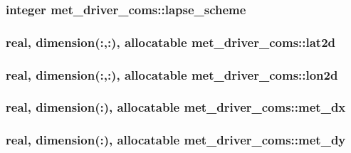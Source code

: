 \subsubsection[{lapse\+\_\+scheme}]{\setlength{\rightskip}{0pt plus 5cm}integer met\+\_\+driver\+\_\+coms\+::lapse\+\_\+scheme}\label{namespacemet__driver__coms_ae37a372059ee47809fc1211fac945fd9}
\hypertarget{namespacemet__driver__coms_ad4ba08a0bb7a7d239acca24ad643df43}{}
\subsubsection[{lat2d}]{\setlength{\rightskip}{0pt plus 5cm}real, dimension(\+:,\+:), allocatable met\+\_\+driver\+\_\+coms\+::lat2d}\label{namespacemet__driver__coms_ad4ba08a0bb7a7d239acca24ad643df43}
\hypertarget{namespacemet__driver__coms_a86a7d638d5a38f95de4804d9e6b72f86}{}
\subsubsection[{lon2d}]{\setlength{\rightskip}{0pt plus 5cm}real, dimension(\+:,\+:), allocatable met\+\_\+driver\+\_\+coms\+::lon2d}\label{namespacemet__driver__coms_a86a7d638d5a38f95de4804d9e6b72f86}
\hypertarget{namespacemet__driver__coms_a668ed875098df886a584635cacc54975}{}
\subsubsection[{met\+\_\+dx}]{\setlength{\rightskip}{0pt plus 5cm}real, dimension(\+:), allocatable met\+\_\+driver\+\_\+coms\+::met\+\_\+dx}\label{namespacemet__driver__coms_a668ed875098df886a584635cacc54975}
\hypertarget{namespacemet__driver__coms_aef439931abb5d16ef45ab6a678c931a6}{}
\subsubsection[{met\+\_\+dy}]{\setlength{\rightskip}{0pt plus 5cm}real, dimension(\+:), allocatable met\+\_\+driver\+\_\+coms\+::met\+\_\+dy}\label{namespacemet__driver__coms_aef439931abb5d16ef45ab6a678c931a6}
\hypertarget{namespacemet__driver__coms_ab40b47c4228b3048c656a3c9b6040a16}{}
